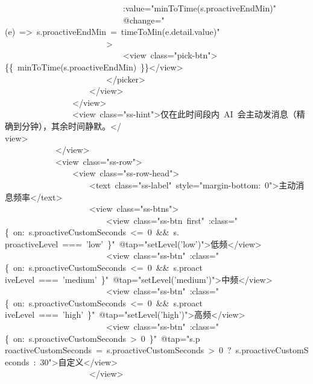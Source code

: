\documentclass[a4paper,10pt]{article}
\begin{document}
{~~~~~~~~~~~~~~~~~~~~~~~~~~~~:value="minToTime(s.proactiveEndMin)"\\
~~~~~~~~~~~~~~~~~~~~~~~~~~~~@change="(e)~=>~s.proactiveEndMin~=~timeToMin(e.detail.value)"\\
~~~~~~~~~~~~~~~~~~~~~~~~>\\
~~~~~~~~~~~~~~~~~~~~~~~~~~~~<view~class="pick-btn">\{\{~minToTime(s.proactiveEndMin)~\}\}</view>\\
~~~~~~~~~~~~~~~~~~~~~~~~</picker>\\
~~~~~~~~~~~~~~~~~~~~</view>\\
~~~~~~~~~~~~~~~~</view>\\
~~~~~~~~~~~~~~~~<view~class="ss-hint">仅在此时间段内~AI~会主动发消息（精确到分钟），其余时间静默。</\\
view>\\
~~~~~~~~~~~~</view>\\
~~~~~~~~~~~~<view~class="ss-row">\\
~~~~~~~~~~~~~~~~<view~class="ss-row-head">\\
~~~~~~~~~~~~~~~~~~~~<text~class="ss-label"~style="margin-bottom:~0">主动消息频率</text>\\
~~~~~~~~~~~~~~~~~~~~<view~class="ss-btns">\\
~~~~~~~~~~~~~~~~~~~~~~~~<view~class="ss-btn~first"~:class="\{~on:~s.proactiveCustomSeconds~<=~0~\&\&~s.\\
proactiveLevel~===~'low'~\}"~@tap="setLevel('low')">低频</view>\\
~~~~~~~~~~~~~~~~~~~~~~~~<view~class="ss-btn"~:class="\{~on:~s.proactiveCustomSeconds~<=~0~\&\&~s.proact\\
iveLevel~===~'medium'~\}"~@tap="setLevel('medium')">中频</view>\\
~~~~~~~~~~~~~~~~~~~~~~~~<view~class="ss-btn"~:class="\{~on:~s.proactiveCustomSeconds~<=~0~\&\&~s.proact\\
iveLevel~===~'high'~\}"~@tap="setLevel('high')">高频</view>\\
~~~~~~~~~~~~~~~~~~~~~~~~<view~class="ss-btn"~:class="\{~on:~s.proactiveCustomSeconds~>~0~\}"~@tap="s.p\\
roactiveCustomSeconds~=~s.proactiveCustomSeconds~>~0~?~s.proactiveCustomSeconds~:~30">自定义</view>\\
~~~~~~~~~~~~~~~~~~~~</view>
}

\newpage
\end{document}
